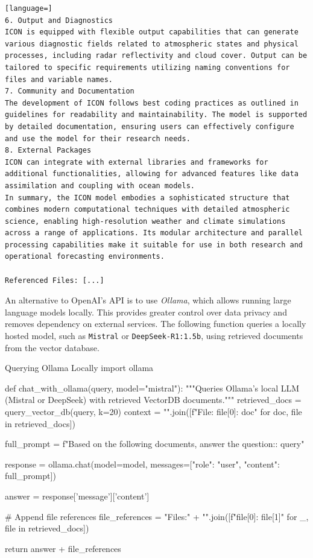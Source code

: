 \begin{lstlisting}[language=]
6. Output and Diagnostics
ICON is equipped with flexible output capabilities that can generate various diagnostic fields related to atmospheric states and physical processes, including radar reflectivity and cloud cover. Output can be tailored to specific requirements utilizing naming conventions for files and variable names.
7. Community and Documentation
The development of ICON follows best coding practices as outlined in guidelines for readability and maintainability. The model is supported by detailed documentation, ensuring users can effectively configure and use the model for their research needs.
8. External Packages
ICON can integrate with external libraries and frameworks for additional functionalities, allowing for advanced features like data assimilation and coupling with ocean models.
In summary, the ICON model embodies a sophisticated structure that combines modern computational techniques with detailed atmospheric science, enabling high-resolution weather and climate simulations across a range of applications. Its modular architecture and parallel processing capabilities make it suitable for use in both research and operational forecasting environments.

Referenced Files: [...]
\end{lstlisting}

An alternative to OpenAI's API is to use \emph{Ollama}, which allows running large language models locally. 
This provides greater control over data privacy and removes dependency on external services. 
The following function queries a locally hosted model, such as \texttt{Mistral} or \texttt{DeepSeek-R1:1.5b}, 
using retrieved documents from the vector database.

\begin{codeonly}{Querying Ollama Locally}
import ollama

def chat_with_ollama(query, model="mistral"):
    """Queries Ollama's local LLM (Mistral or DeepSeek) with retrieved VectorDB documents."""
    retrieved_docs = query_vector_db(query, k=20)
    context = "\n\n".join([f"File: {file[0]}\nContent: {doc}" for doc, file in retrieved_docs])

    full_prompt = f"Based on the following documents, answer the question:\n\nQuestion: {query}"

    response = ollama.chat(model=model, messages=[{"role": "user", "content": full_prompt}])

    answer = response['message']['content']

    # Append file references
    file_references = "\n\nReferenced Files:\n" + "\n".join([f"{file[0]}: {file[1]}" for _, file in retrieved_docs])

    return answer + file_references
\end{codeonly}

